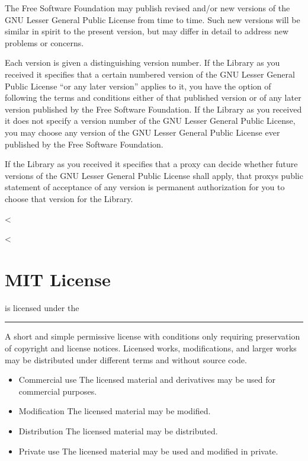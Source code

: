 \documentclass[letterpaper,10pt,english]{sphinxmanual}
\begin{document}
\begin{sphinxVerbatim}[commandchars=\\\{\}]
The Free Software Foundation may publish revised and/or new versions of the
GNU Lesser General Public License from time to time. Such new versions will
be similar in spirit to the present version, but may differ in detail to
address new problems or concerns.

Each version is given a distinguishing version number. If the Library as you
received it specifies that a certain numbered version of the GNU Lesser
General Public License “or any later version” applies to it, you have the
option of following the terms and conditions either of that published version
or of any later version published by the Free Software Foundation. If the
Library as you received it does not specify a version number of the GNU Lesser
General Public License, you may choose any version of the GNU Lesser General
Public License ever published by the Free Software Foundation.

If the Library as you received it specifies that a proxy can decide whether
future versions of the GNU Lesser General Public License shall apply, that
proxy\PYGZsq{}s public statement of acceptance of any version is permanent
authorization for you to choose that version for the Library.
\end{sphinxVerbatim}


<%
\sphinxstepscope

<%
\chapter{MIT License}
\label{\detokenize{examples/mit:mit-license}}\label{\detokenize{examples/mit::doc}}
 is licensed under the 



\bigskip\hrule\bigskip



A short and simple permissive license with conditions only requiring preservation of copyright and license notices. Licensed works, modifications, and larger works may be distributed under different terms and without source code.

\vspace{10px}

\begin{itemize}
\item {}
Commercial use \textendash{} The licensed material and derivatives may be used for commercial purposes.

\item {}
Modification \textendash{} The licensed material may be modified.

\item {}
Distribution \textendash{} The licensed material may be distributed.

\item {}
Private use \textendash{} The licensed material may be used and modified in private.

\end{itemize}
\end{document}
